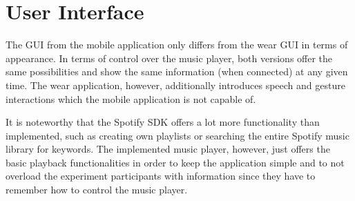 \section{User Interface}\label{sec:UserInterface}
The \ac{GUI} from the mobile application only differs from the wear \ac{GUI} in terms of appearance. In terms of control over the music player, both versions offer the same possibilities and show the same information (when connected) at any given time. The wear application, however, additionally introduces speech and gesture interactions which the mobile application is not capable of.

It is noteworthy that the Spotify \ac{SDK} offers a lot more functionality than implemented, such as creating own playlists or searching the entire Spotify music library for keywords. The implemented music player, however, just offers the basic playback functionalities in order to keep the application simple and to not overload the experiment participants with information since they have to remember how to control the music player.

